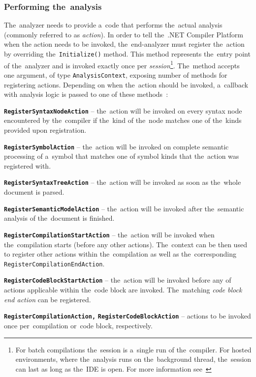 \documentclass[
  digital, %
  table,   %
  lof,     %
  lot,     %
  oneside,
]{fithesis3}
\begin{document}
\subsubsection{\textbf{Performing the~analysis}}
The~analyzer needs to provide a~code that performs the~actual analysis (commonly referred to as \textit{action}). In order to tell the~.NET Compiler Platform when the action needs to be invoked, the~end-analyzer must register the~action by overriding the~\texttt{Initialize()} method. This method represents the~entry point of the~analyzer and is invoked exactly once per \textit{session}\footnote{For batch compilations the~session is a~single run of the~compiler. For hosted environments, where the~analysis runs on the~background thread, the~session can last as long as the~IDE is open. For more information see~\cite{analyzer-action-semantics}}. The~method accepts one argument, of type \texttt{AnalysisContext}, exposing number of methods for registering actions. Depending on when the~action should be invoked, a~callback with analysis logic is passed to one of these methods~\cite{analyzer-action-semantics}:

\smallskip
\begin{compactitem}
  \item[\texttt{\textbf{RegisterSyntaxNodeAction}}] -- the~action will be invoked on every syntax node encountered by the~compiler if the~kind of the~node matches one of the~kinds provided upon registration.
  
  \item[\texttt{\textbf{RegisterSymbolAction}}] -- the~action will be invoked on complete semantic processing of a~symbol that matches one of symbol kinds that the~action was registered with.
  
  \item[\texttt{\textbf{RegisterSyntaxTreeAction}}] -- the~action will be invoked as soon as the~whole document is parsed.
  
  \item[\texttt{\textbf{RegisterSemanticModelAction}}] -- the~action will be invoked after the~semantic analysis of the~document is finished.
  
  \item[\texttt{\textbf{RegisterCompilationStartAction}}] -- the~action will be invoked when the~compilation starts (before any other actions). The~context can be then used to register other actions within the~compilation as well as the~corresponding \texttt{RegisterCompilationEndAction}.
  
  \item[\texttt{\textbf{RegisterCodeBlockStartAction}}] -- the~action will be invoked before any of actions applicable within the~code block are invoked. The~matching \textit{code block end action} can be registered.
  
  \item[\texttt{\textbf{RegisterCompilationAction,}}] \texttt{\textbf{RegisterCodeBlockAction}} -- actions to be invoked once per~compilation or~code block, respectively.
\end{compactitem}
\end{document}
